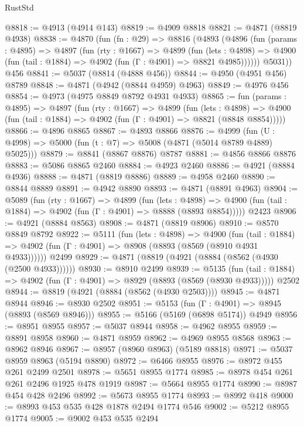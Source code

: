 \begin{lexlean}{RustStd}
\begin{coremodule}
{\begin{coremodule}
{{{{{{{{{{{{{{{{{{{{{{{{{{{{{@8818 := @4913 (@4914 @143)
@8819 := @4909 @8818
@8821 := @4871 (@8819 @4938)
@8838 := @4870
    (fun (fn : @29) =>
    @8816
      (@4893
        (@4896
          (fun (params : @4895) =>
          @4897
            (fun (rty : @1667) =>
            @4899
              (fun (lets : @4898) =>
              @4900 (fun (tail : @1884) => @4902 (fun (Γ : @4901) => @8821 @4985))))))
        @5031))
    @456
@8841 := @5037 (@8814 (@4888 @456))
@8844 := @4950 (@4951 @456) @8789
@8848 := @4871 (@4942 (@8844 @4959) @4963)
@8849 := @4976 @456
@8854 := @4973 (@4975 @8849 @8792 @4931 @4933)
@8865 := fun (params : @4895) =>
  @4897
    (fun (rty : @1667) =>
    @4899
      (fun (lets : @4898) =>
      @4900 (fun (tail : @1884) => @4902 (fun (Γ : @4901) => @8821 (@8848 @8854)))))
@8866 := @4896 @8865
@8867 := @4893 @8866
@8876 := @4999 (fun (U : @4998) => @5000 (fun (t : @7) => @5008 (@4871 (@5014 @8789 @4889) @5025)))
@8879 := @8841 (@8867 @8876) @8787
@8881 := @4856 @8866 @8876
@8883 := @5086 @8865 @2460
@8884 := @4923 @2460
@8886 := @4921 (@8884 @4936)
@8888 := @4871 (@8819 @8886)
@8889 := @4958 @2460
@8890 := @8844 @8889
@8891 := @4942 @8890
@8893 := @4871 (@8891 @4963)
@8904 := @5089
    (fun (rty : @1667) =>
    @4899
      (fun (lets : @4898) =>
      @4900 (fun (tail : @1884) => @4902 (fun (Γ : @4901) => @8888 (@8893 @8854)))))
    @2423
@8906 := @4921 (@8884 @8563)
@8908 := @4871 (@8819 @8906)
@8910 := @8570 @8849 @8792
@8922 := @5111
    (fun (lets : @4898) =>
    @4900
      (fun (tail : @1884) => @4902 (fun (Γ : @4901) => @8908 (@8893 (@8569 (@8910 @4931 @4933))))))
    @2499
@8929 := @4871 (@8819 (@4921 (@8884 (@8562 (@4930 (@2500 @4933))))))
@8930 := @8910 @2499
@8939 := @5135
    (fun (tail : @1884) => @4902 (fun (Γ : @4901) => @8929 (@8893 (@8569 (@8930 @4933)))))
    @2502
@8944 := @8819 (@4921 (@8884 (@8562 (@4930 @2503))))
@8945 := @4871 @8944
@8946 := @8930 @2502
@8951 := @5153 (fun (Γ : @4901) => @8945 (@8893 (@8569 @8946)))
@8955 := @5166 (@5169 (@6898 @5174)) @4949
@8956 := @8951 @8955
@8957 := @5037 @8944
@8958 := @4962 @8955
@8959 := @8891 @8958
@8960 := @4871 @8959
@8962 := @4969 @8955 @8568
@8963 := @8962 @8946
@8967 := @8957 (@8960 @8963) (@5189 @8818)
@8971 := @5037 @8959 @8963 (@5194 @8890)
@8972 := @6466 @8955
@8976 := @8972 @455 @261 @2499 @2501
@8978 := @5651 @8955 @1774
@8985 := @8978 @454 @261 @261 @2496 @1925 @478 @1919
@8987 := @5664 @8955 @1774
@8990 := @8987 @454 @428 @2496
@8992 := @5673 @8955 @1774
@8993 := @8992 @418
@9000 := @8993 @453 @535 @428 @1878 @2494 @1774 @546
@9002 := @5212 @8955 @1774
@9005 := @9002 @453 @535 @2494
}}}}}}}}}}}}}}}}}}}}}}}}}}}}}
\end{coremodule}}
\end{coremodule}
\end{lexlean}
